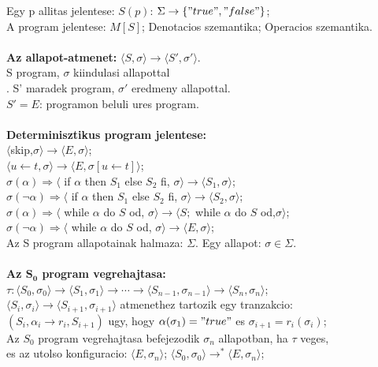 \documentclass[a4paper,10pt]{article}
\begin{document}
Egy p allitas jelentese: $S(p)$: $\Sigma \to\lbrace"true", "false"\rbrace$;\\
A program jelentese: $M[S]$; Denotacios szemantika; Operacios szemantika.\\ \\
\textbf{Az allapot-atmenet:} $\langle S, \sigma\rangle \to \langle S',\sigma'\rangle$.\\
S program, $\sigma$ kiindulasi allapottal\\.
S' maradek program, $\sigma'$ eredmeny allapottal.\\
$S'=E$: programon beluli ures program.\\\\
\textbf{Determinisztikus program jelentese:}\\
$\langle$skip,$\sigma \rangle \to \langle E, \sigma \rangle$;\\
$\langle u \gets t, \sigma \rangle \to \langle E, \sigma[u \gets t] \rangle$;\\
$\sigma(\alpha) \Rightarrow \langle$ if $\alpha$ then $S_1$ else $S_2$ fi, $\sigma \rangle \to \langle S_1, \sigma\rangle$;\\
$\sigma(\neg\alpha) \Rightarrow \langle$ if $\alpha$ then $S_1$ else $S_2$ fi, $\sigma \rangle \to \langle S_2, \sigma\rangle$;\\
$\sigma(\alpha) \Rightarrow \langle$ while $\alpha$ do $S$ od, $\sigma\rangle \to \langle S;$ while $\alpha$ do $S$ od,$\sigma\rangle$;\\
$\sigma(\neg\alpha) \Rightarrow \langle$ while $\alpha$ do $S$ od, $\sigma\rangle \to \langle E, \sigma\rangle$;\\
Az S program allapotainak halmaza: $\Sigma$. Egy allapot: $\sigma \in \Sigma$.\\\\
\textbf{Az $\mathbf{S_0}$ program vegrehajtasa:}\\
$\tau: \langle S_0, \sigma_0\rangle \to \langle S_1, \sigma_1\rangle \to \cdots \to \langle S_{n-1}, \sigma_{n-1}\rangle \to \langle S_n, \sigma_n\rangle$;\\
$\langle S_i, \sigma_i\rangle \to \langle S_{i+1}, \sigma_{i+1}\rangle$ atmenethez tartozik egy tranzakcio:\\
$(S_i, \alpha_i \to r_i, S_{i+1})$ ugy, hogy $\alpha(\sigma_1)="true"$ es $\sigma_{i+1}=r_i(\sigma_i)$;\\
Az $S_0$ program vegrehajtasa befejezodik $\sigma_n$ allapotban, ha $\tau$ veges,\\
es az utolso konfiguracio: $\langle E, \sigma_n\rangle$; $\langle S_0, \sigma_0\rangle \to^* \langle E, \sigma_n\rangle$;\\
\end{document}
